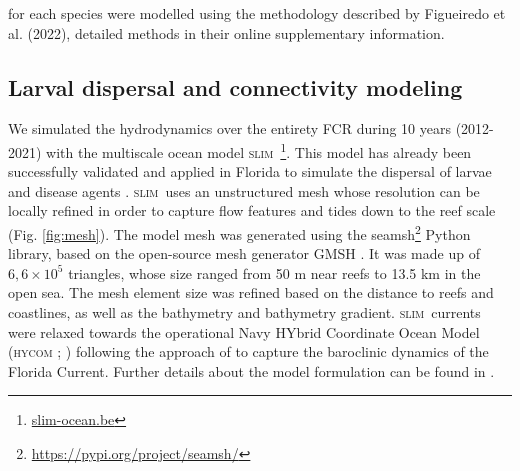 \documentclass[preprint,12pt,authoryear]{elsarticle}
\newcommand{\hycom}{\textsc{hycom} }
\newcommand{\slim}{\textsc{slim}\ }
\begin{document}
for each species were modelled using the methodology described by Figueiredo et al. (2022), detailed methods in their online supplementary information.



\subsection*{Larval dispersal and connectivity modeling}

We simulated the hydrodynamics over the entirety FCR during 10 years (2012-2021) with the multiscale ocean model \slim\footnote{\href{ https://www.slim-ocean.be}{slim-ocean.be}}. This model has already been successfully validated and applied in Florida to simulate the dispersal of larvae and disease agents \citep{frys2020fine,dobbelaere2020coupled}. \slim uses an unstructured mesh whose resolution can be locally refined in order to capture flow features and tides down to the reef scale (Fig. \ref{fig:mesh}). The model mesh was generated using the seamsh\footnote{\href{https://pypi.org/project/seamsh/}{https://pypi.org/project/seamsh/}} Python library, based on the open-source mesh generator GMSH \citep{geuzaine2009gmsh}. It was made up of $6,6\times 10^5$ triangles, whose size ranged from 50 m near reefs to 13.5 km in the open sea. The mesh element size was refined based on the distance to reefs and coastlines, as well as the bathymetry and bathymetry gradient. \slim currents were relaxed towards the operational Navy HYbrid Coordinate Ocean Model (\hycom; \citealp{chassignet2007hycom}) following the approach of \citep{dobbelaere2022impacts} to capture the baroclinic dynamics of the Florida Current. Further details about the model formulation can be found in \citep{frys2020fine}.
\end{document}
